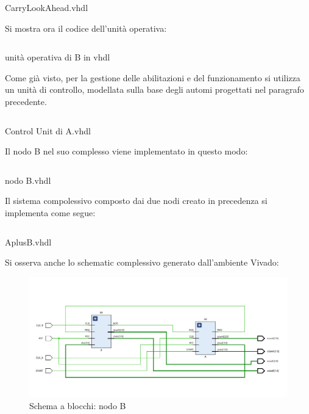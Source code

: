 \begin{code}
    \inputminted[frame=lines, framesep=2mm, baselinestretch=1.2, bgcolor=LightGray, fontsize=\footnotesize, linenos]{vhdl}{vhdl_files/preappDicembre/CarryLookAhead.vhd}
    \caption{CarryLookAhead.vhdl}
    \label{lst:mux_2_1}
\end{code}
Si mostra ora il codice dell'unità operativa:
\begin{code}
    \inputminted[frame=lines, framesep=2mm, baselinestretch=1.2, bgcolor=LightGray, fontsize=\footnotesize, linenos]{vhdl}{vhdl_files/preappDicembre/unita_operativaB.vhd}
    \caption{unità operativa di B in vhdl}
    \label{lst:mux_2_1}
\end{code}
Come già visto, per la gestione delle abilitazioni e del funzionamento si utilizza un unità di controllo, modellata sulla base degli automi progettati nel paragrafo precedente.
\begin{code}
    \inputminted[frame=lines, framesep=2mm, baselinestretch=1.2, bgcolor=LightGray, fontsize=\footnotesize, linenos]{vhdl}{vhdl_files/preappDicembre/UCB.vhd}
    \caption{Control Unit di A.vhdl}
    \label{lst:mux_2_1}
\end{code}
Il nodo B nel suo complesso viene implementato in questo modo:
\begin{code}
    \inputminted[frame=lines, framesep=2mm, baselinestretch=1.2, bgcolor=LightGray, fontsize=\footnotesize, linenos]{vhdl}{vhdl_files/preappDicembre/B.vhd}
    \caption{nodo B.vhdl}
    \label{lst:mux_2_1}
\end{code}
Il sistema compolessivo composto dai due nodi creato in precedenza si implementa come segue:
\begin{code}
    \inputminted[frame=lines, framesep=2mm, baselinestretch=1.2, bgcolor=LightGray, fontsize=\footnotesize, linenos]{vhdl}{vhdl_files/preappDicembre/AplusB.vhd}
    \caption{AplusB.vhdl}
    \label{lst:mux_2_1}
\end{code}
Si osserva anche lo schematic complessivo generato dall'ambiente Vivado:
\begin{figure}[H]
	\centering
	\includegraphics[width=1\textwidth]{img/preappDicembre/schematic_preapp}
	\caption{Schema a blocchi: nodo B}
	\label{wf_preapp} 
\end{figure}

